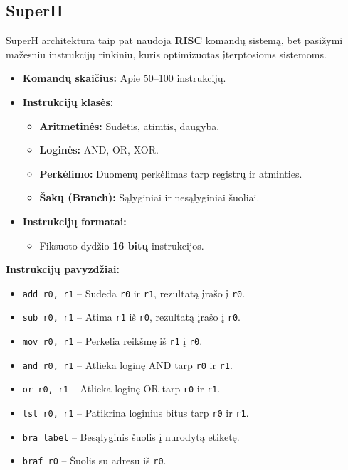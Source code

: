 \documentclass{article}
\begin{document}
\subsection{SuperH}
SuperH architektūra taip pat naudoja \textbf{RISC} komandų sistemą, bet pasižymi mažesniu instrukcijų rinkiniu, kuris optimizuotas įterptosioms sistemoms.

\begin{itemize}
    \item \textbf{Komandų skaičius:} Apie 50–100 instrukcijų.
    \item \textbf{Instrukcijų klasės:}
        \begin{itemize}
            \item \textbf{Aritmetinės:} Sudėtis, atimtis, daugyba.
            \item \textbf{Loginės:} AND, OR, XOR.
            \item \textbf{Perkėlimo:} Duomenų perkėlimas tarp registrų ir atminties.
            \item \textbf{Šakų (Branch):} Sąlyginiai ir nesąlyginiai šuoliai.
        \end{itemize}
    \item \textbf{Instrukcijų formatai:}
        \begin{itemize}
            \item Fiksuoto dydžio \textbf{16 bitų} instrukcijos.
        \end{itemize}
\end{itemize}

\textbf{Instrukcijų pavyzdžiai:}
\begin{itemize}
    \item \texttt{add r0, r1} – Sudeda \texttt{r0} ir \texttt{r1}, rezultatą įrašo į \texttt{r0}.
    \item \texttt{sub r0, r1} – Atima \texttt{r1} iš \texttt{r0}, rezultatą įrašo į \texttt{r0}.
    \item \texttt{mov r0, r1} – Perkelia reikšmę iš \texttt{r1} į \texttt{r0}.
    \item \texttt{and r0, r1} – Atlieka loginę AND tarp \texttt{r0} ir \texttt{r1}.
    \item \texttt{or r0, r1} – Atlieka loginę OR tarp \texttt{r0} ir \texttt{r1}.
    \item \texttt{tst r0, r1} – Patikrina loginius bitus tarp \texttt{r0} ir \texttt{r1}.
    \item \texttt{bra label} – Besąlyginis šuolis į nurodytą etiketę.
    \item \texttt{braf r0} – Šuolis su adresu iš \texttt{r0}.
\end{itemize}
\end{document}

